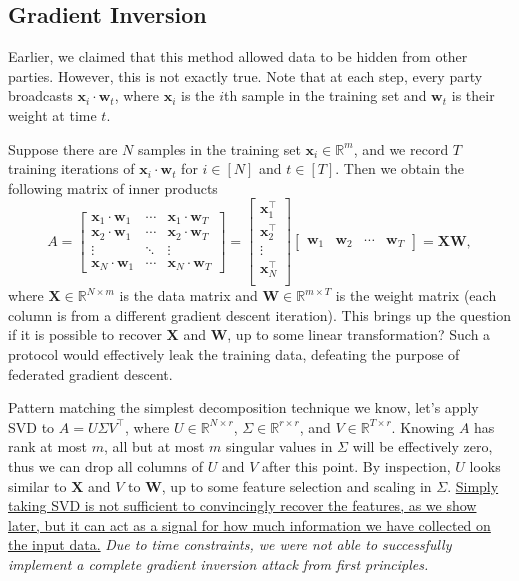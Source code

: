 \documentclass{article}
\begin{document}
\subsection{Gradient Inversion}
Earlier, we claimed that this method allowed data to be hidden from other parties.
However, this is not exactly true.
Note that at each step, every party broadcasts $\mathbf x_i\cdot \mathbf w_t$, where $\mathbf x_i$ is the $i$th sample in the training set and $\mathbf w_t$ is their weight at time $t$.

Suppose there are $N$ samples in the training set $\mathbf x_i\in\mathbb R^m$, and we record $T$ training iterations of $\mathbf x_i\cdot\mathbf w_t$ for $i\in[N]$ and $t\in[T]$.
Then we obtain the following matrix of inner products
\begin{equation}
    A=
    \begin{bmatrix}
        \mathbf x_1\cdot\mathbf w_1 & \cdots & \mathbf x_1\cdot\mathbf w_T\\
        \mathbf x_2\cdot\mathbf w_1 & \cdots & \mathbf x_2\cdot\mathbf w_T \\
        \vdots & \ddots & \vdots\\
        \mathbf x_N\cdot\mathbf w_1 & \cdots & \mathbf x_N\cdot\mathbf w_T
    \end{bmatrix}
    =\begin{bmatrix}
        \mathbf x_1^\intercal\\
        \mathbf x_2^\intercal\\
        \vdots\\
        \mathbf x_N^\intercal\\
    \end{bmatrix}
    \begin{bmatrix}
        \mathbf w_1&
        \mathbf w_2&
        \cdots&
        \mathbf w_T
    \end{bmatrix}
    =\mathbf X\mathbf W,
\end{equation}
where $\mathbf X\in\mathbb R^{N\times m}$ is the data matrix and $\mathbf W\in\mathbb R^{m\times T}$ is the weight matrix (each column is from a different gradient descent iteration).
This brings up the question if it is possible to recover $\mathbf X$ and $\mathbf W$, up to some linear transformation?
Such a protocol would effectively leak the training data, defeating the purpose of federated gradient descent.

Pattern matching the simplest decomposition technique we know, let's apply SVD to $A=U\Sigma V^\intercal$, where $U\in\mathbb R^{N\times r}$, $\Sigma\in\mathbb R^{r\times r}$, and $V\in\mathbb R^{T\times r}$.
Knowing $A$ has rank at most $m$, all but at most $m$ singular values in $\Sigma$ will be effectively zero, thus we can drop all columns of $U$ and $V$ after this point.
By inspection, $U$ looks similar to $\mathbf X$ and $V$ to $\mathbf W$, up to some feature selection and scaling in $\Sigma$.
\uline{Simply taking SVD is not sufficient to convincingly recover the features, as we show later, but it can act as a signal for how much information we have collected on the input data.}
\textit{Due to time constraints, we were not able to successfully implement a complete gradient inversion attack from first principles.}
\end{document}
